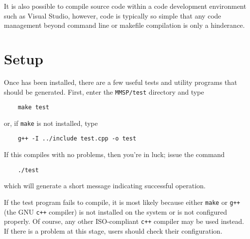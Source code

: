 It is also possible to compile \MMSP source code within a code development environment such as Visual Studio, however, \MMSP code is typically so simple that any code management beyond command line or makefile compilation is only a hinderance.

\section{Setup}
Once \MMSP has been installed, there are a few useful tests and utility programs that should be generated.  First, enter the {\tt MMSP/test} directory and type
\begin{shadebox}
\begin{verbatim}
    make test
\end{verbatim}
\end{shadebox}
or, if {\tt make} is not installed, type
\begin{shadebox}
\begin{verbatim}
    g++ -I ../include test.cpp -o test
\end{verbatim}
\end{shadebox}
If this compiles with no problems, then you're in luck; issue the command
\begin{shadebox}
\begin{verbatim}
    ./test
\end{verbatim}
\end{shadebox}
which will generate a short message indicating successful operation.

If the test program fails to compile, it is most likely because either {\tt make} or {\tt g++} (the GNU {\tt c++} compiler) is not installed on the system or is not configured properly.  Of course, any other ISO-compliant {\tt c++} compiler may be used instead.  If there is a problem at this stage, users should check their configuration.

